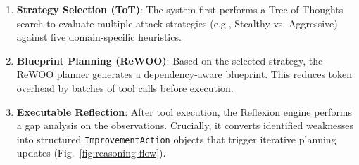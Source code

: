 \begin{enumerate}
    \item \textbf{Strategy Selection (ToT)}: The system first performs a Tree of Thoughts search to evaluate multiple attack strategies (e.g., Stealthy vs. Aggressive) against five domain-specific heuristics.
    \item \textbf{Blueprint Planning (ReWOO)}: Based on the selected strategy, the ReWOO planner generates a dependency-aware blueprint. This reduces token overhead by batches of tool calls before execution.
    \item \textbf{Executable Reflection}: After tool execution, the Reflexion engine performs a gap analysis on the observations. Crucially, it converts identified weaknesses into structured \texttt{ImprovementAction} objects that trigger iterative planning updates (Fig.~\ref{fig:reasoning-flow}).
\end{enumerate}


